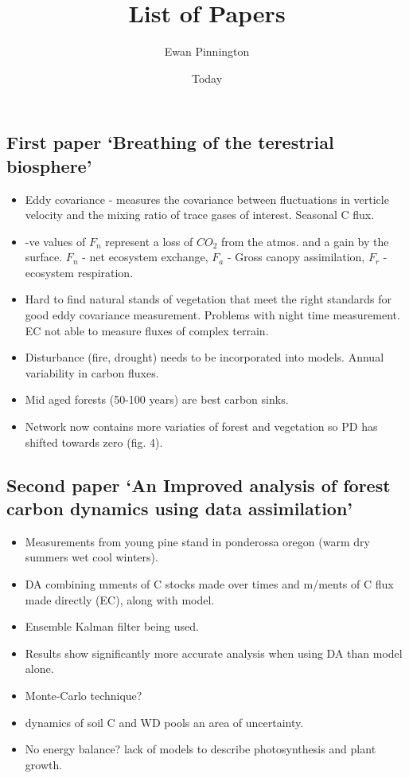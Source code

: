 \documentclass[11pt]{article}
\title{List of Papers}
\author{Ewan Pinnington}
\date{Today}
\begin{document}
\maketitle

\subsection*{First paper `Breathing of the terestrial biosphere' \cite{baldocchi2008turner}}
\noindent
\begin{itemize}
\item Eddy covariance - measures the covariance between fluctuations in verticle velocity and the mixing ratio of trace gases of interest. Seasonal C flux.
\item -ve values of $F_{n}$ represent a loss of $CO_{2}$ from the atmos. and a gain by the surface. $F_{n}$ - net ecosystem exchange, $F_{a}$ - Gross canopy assimilation, $F_{r}$ - ecosystem respiration.
\item Hard to find natural stands of vegetation that meet the right standards for good eddy covariance measurement. Problems with night time measurement. EC not able to measure fluxes of complex terrain.
\item Disturbance (fire, drought) needs to be incorporated into models. Annual variability in carbon fluxes. 
\item Mid aged forests (50-100 years) are best carbon sinks.
\item Network now contains more variaties of forest and vegetation so PD has shifted towards zero (fig. 4).
\end{itemize}


\subsection*{Second paper `An Improved analysis of forest carbon dynamics using data assimilation' \cite{williams2005improved}}
\begin{itemize}
\item Measurements from young pine stand in ponderossa oregon (warm dry summers wet cool winters).
\item DA combining mments of C stocks made over times and m/ments of C flux made directly (EC), along with model.
\item Ensemble Kalman filter being used.
\item Results show significantly more accurate analysis when using DA than model alone.
\item Monte-Carlo technique?
\item dynamics of soil C and WD pools an area of uncertainty.
\item No energy balance? lack of models to describe photosynthesis and plant growth.
\end{itemize}
\end{document}
